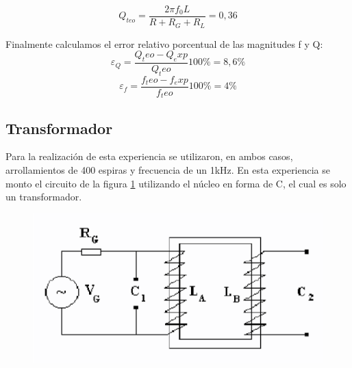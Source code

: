 \documentclass{article}
\begin{document}
\begin{equation}
Q_{teo} = \frac{2 \pi f_0 L}{R + R_G + R_L} = 0,36
\end{equation}

Finalmente calculamos el error relativo porcentual de las magnitudes f y Q:
\begin{equation}
\varepsilon_Q = \frac{Q_teo - Q_exp}{Q_teo} 100\% = 8,6\%
\end{equation}
\begin{equation}
\varepsilon_f = \frac{f_teo - f_exp}{f_teo} 100\% = 4\%
\end{equation}

\subsection{Transformador}

Para la realización de esta experiencia se utilizaron, en ambos casos, arrollamientos de 400 espiras y frecuencia de un 1kHz. 
En esta experiencia se monto el circuito de la figura \ref{fig:nucleo_c} utilizando el núcleo en forma de C, el cual es solo
un transformador.

\begin{figure}[H]
\centering
\includegraphics[width=\columnwidth]{transformador_nucleo_c}
\label{fig:nucleo_c}
\end{figure}
\end{document}
